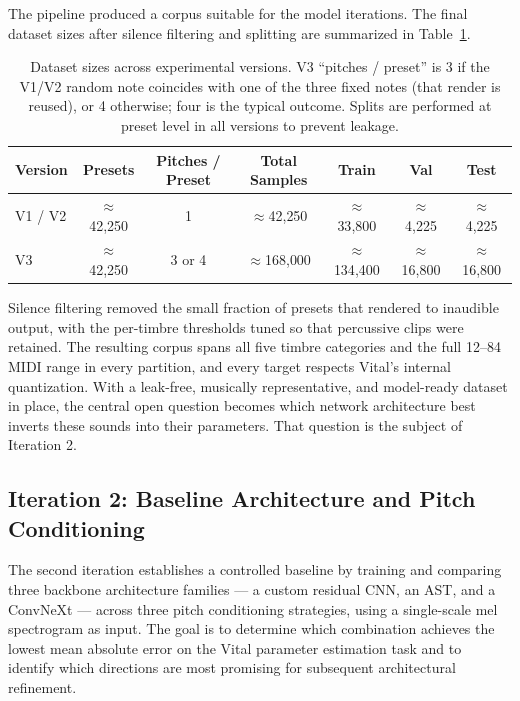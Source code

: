\noindent
The pipeline produced a corpus suitable for the model iterations. The final dataset sizes after silence filtering and splitting are summarized in Table~\ref{tab:dataset_sizes}.

\begin{table}[H]
\centering
\renewcommand{\arraystretch}{1.3}
\begin{tabular}{lcccccc}
\hline
\textbf{Version} & \textbf{Presets} & \textbf{Pitches / Preset} & \textbf{Total Samples} & \textbf{Train} & \textbf{Val} & \textbf{Test} \\
\hline
V1 / V2 & $\approx$42{,}250 & 1       & $\approx$42{,}250  & $\approx$33{,}800  & $\approx$4{,}225  & $\approx$4{,}225  \\
V3      & $\approx$42{,}250 & 3 or 4  & $\approx$168{,}000 & $\approx$134{,}400 & $\approx$16{,}800 & $\approx$16{,}800 \\
\hline
\end{tabular}
\vspace{0.3cm}
\caption{Dataset sizes across experimental versions. V3 ``pitches / preset'' is 3 if the V1/V2 random note coincides with one of the three fixed notes (that render is reused), or 4 otherwise; four is the typical outcome. Splits are performed at preset level in all versions to prevent leakage.}
\label{tab:dataset_sizes}
\end{table}

\noindent
Silence filtering removed the small fraction of presets that rendered to inaudible output, with the per-timbre thresholds tuned so that percussive clips were retained. The resulting corpus spans all five timbre categories and the full 12--84 MIDI range in every partition, and every target respects Vital's internal quantization. With a leak-free, musically representative, and model-ready dataset in place, the central open question becomes which network architecture best inverts these sounds into their parameters. That question is the subject of Iteration 2.

\subsection{Iteration 2: Baseline Architecture and Pitch Conditioning}

\noindent
The second iteration establishes a controlled baseline by training and comparing three backbone architecture families — a custom residual CNN, an AST, and a ConvNeXt — across three pitch conditioning strategies, using a single-scale mel spectrogram as input. The goal is to determine which combination achieves the lowest mean absolute error on the Vital parameter estimation task and to identify which directions are most promising for subsequent architectural refinement.

